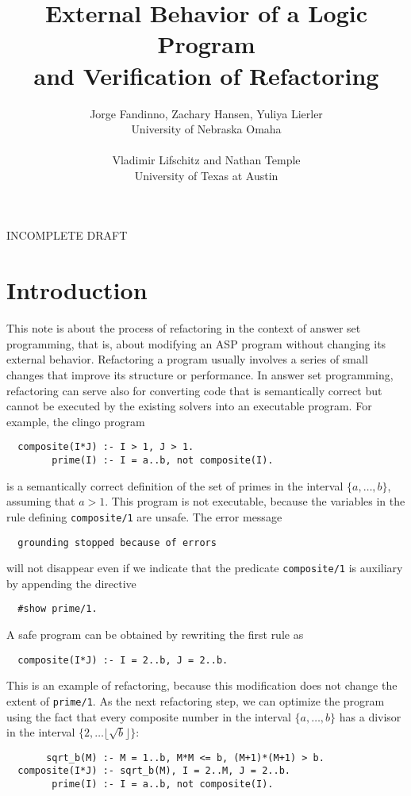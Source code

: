 \documentclass{article}
\begin{document}
\title{\bf External Behavior of a Logic Program\\
  and Verification of Refactoring}
\author{Jorge Fandinno, Zachary Hansen, Yuliya Lierler\\
  University of Nebraska Omaha\\ \\
Vladimir Lifschitz and Nathan Temple\\ University of Texas at Austin}
\date{}

\maketitle

\begin{center}INCOMPLETE DRAFT\end{center}

\section{Introduction}

This note is about the process of refactoring in the context of answer
set programming, that is, about modifying an ASP program without changing
its external behavior.  Refactoring a program usually involves a series of
small changes that improve its structure or performance.  In answer set
programming, refactoring can serve also for converting code that is
semantically correct but cannot be executed by the existing solvers into an
executable program.  For example, the {\sc clingo} program
\begin{verbatim}
  composite(I*J) :- I > 1, J > 1.
        prime(I) :- I = a..b, not composite(I).
\end{verbatim}
is a semantically correct definition of the set of primes in the
interval $\{a,\dots,b\}$, assuming that $a>1$.  This program
is not executable, because the variables in
the rule defining \verb|composite/1| are unsafe.  The error message
\begin{verbatim}
  grounding stopped because of errors
\end{verbatim}
will not disappear even if we indicate that the predicate
\verb|composite/1| is auxiliary by appending the directive
\begin{verbatim}
  #show prime/1.
\end{verbatim}
A safe program can be obtained by rewriting the first rule as
\begin{verbatim}
  composite(I*J) :- I = 2..b, J = 2..b.
\end{verbatim}
This is an example of refactoring, because this modification
does not change the extent of \verb|prime/1|.
As the next refactoring step, we can optimize the program using the
fact that every composite
number in the interval $\{a,\dots,b\}$ has a divisor in the interval
$\{2,\dots\lfloor \sqrt b\rfloor\}$:
\begin{verbatim}
       sqrt_b(M) :- M = 1..b, M*M <= b, (M+1)*(M+1) > b.
  composite(I*J) :- sqrt_b(M), I = 2..M, J = 2..b.
        prime(I) :- I = a..b, not composite(I).
\end{verbatim}
\end{document}
